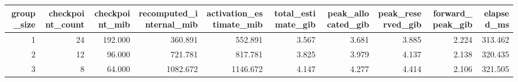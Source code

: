 \begin{tabular}{rrrrrrrrrr}
\toprule
group\_size & checkpoint\_count & checkpoint\_mib & recomputed\_internal\_mib & activation\_estimate\_mib & total\_estimate\_gib & peak\_allocated\_gib & peak\_reserved\_gib & forward\_peak\_gib & elapsed\_ms \\
\midrule
1 & 24 & 192.000 & 360.891 & 552.891 & 3.567 & 3.681 & 3.885 & 2.224 & 313.462 \\
2 & 12 & 96.000 & 721.781 & 817.781 & 3.825 & 3.979 & 4.137 & 2.138 & 320.435 \\
3 & 8 & 64.000 & 1082.672 & 1146.672 & 4.147 & 4.277 & 4.414 & 2.106 & 321.505 \\
\bottomrule
\end{tabular}
